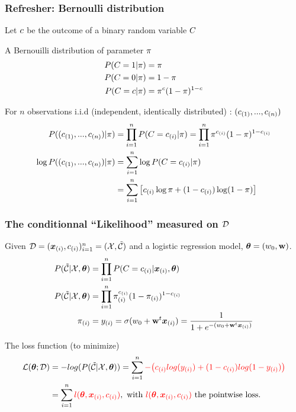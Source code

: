 


\begin{frame}
  \frametitle{Refresher:  Bernoulli distribution}
  Let ${c}$ be the outcome of a binary random variable ${C}$
  \begin{block}{A Bernouilli distribution of parameter $\pi$}
    \begin{align*}
      P({C}=1|\pi) &= \pi\\ 
      P({C}=0|\pi) &= 1-\pi \\
      P({C}={c}|\pi) &= \pi^{{c}} (1-\pi)^{1-{c}}
    \end{align*}
  \end{block}
  For  $n$ observations i.i.d  (independent, identically distributed) : $({c}_{(1)}, ... , {c}_{(n)} )$
  \begin{align*}
    P(({c}_{(1)}, ... , {c}_{(n)} )|\pi) &= \prod_{i=1}^n P({C}={c}_{(i)}|\pi) = \prod_{i=1}^n \pi^{{c}_{(i)}} (1-\pi)^{1-{c}_{(i)}}\\
    \log P(({c}_{(1)}, ... , {c}_{(n)} )|\pi) &= \sum_{i=1}^n \log P({C}={c}_{(i)}|\pi) \\
    &= \sum_{i=1}^n \big[ {{c}_{(i)}}\log\pi + (1-{c}_{(i)})\log (1-\pi) \big]
  \end{align*}
  \end{frame}


  
\begin{frame}
  \frametitle{The conditionnal ``Likelihood'' measured on $\mathcal{D}$}
     Given $\mathcal{D} = (\boldsymbol{x}_{(i)},{c}_{(i)})_{i=1}^n = (\mathcal{X},\tilde{\mathcal{C}})$ and a logistic regression model, $\boldsymbol{\theta} =  (w_0, \mathbf{w})$. 
     \begin{align*}
       P(\tilde{\mathcal{C}} | \mathcal{X}, \boldsymbol{\theta}) &= \prod_{i=1}^n P({C} = {c}_{(i)}| \boldsymbol{x}_{(i)}, \boldsymbol{\theta}) \\
       P(\tilde{\mathcal{C}} | \mathcal{X}, \boldsymbol{\theta}) &= \prod_{i=1}^n\pi_{(i)}^{{c}_{(i)}} (1-\pi_{(i)})^{1-{c}_{(i)}}\\
       \pi_{(i)} &= y_{(i)} = \sigma(w_0 + \mathbf{w}^t\boldsymbol{x}_{(i)})  = \frac{1}{1+e^{-(w_0 + \mathbf{w}^t\boldsymbol{x}_{(i)})}}
     \end{align*}
     \begin{block}{The loss function (to minimize)}
       \begin{align*}
         \mathcal{L}(\boldsymbol{\theta};\mathcal{D}) &= - log(P(\tilde{\mathcal{C}} | \mathcal{X}, \boldsymbol{\theta}) ) =  \sum_{i=1}^n  {\color{red} - \big(  {c}_{(i)} log(y_{(i)} )+ (1-{c}_{(i)}) log(1-y_{(i)})  \big)}\\
                   &= \sum_{i=1}^n  {\color{red} l(\boldsymbol{\theta},\boldsymbol{x}_{(i)},{c}_{(i)}) }, \textrm{ with } {\color{red} \ensuremath{l}(\ensuremath{\boldsymbol{\theta}},\ensuremath{\boldsymbol{x}_{(i)}},\ensuremath{{c}_{(i)}})} \textrm{ the pointwise loss.}
       \end{align*}
     \end{block}
\end{frame}
